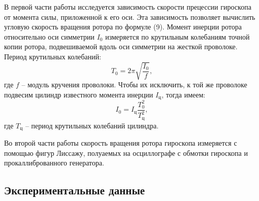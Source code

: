 \documentclass[a4paper, 12pt]{article}%
\begin{document}
В первой части работы исследуется зависимость скорости прецессии гироскопа от момента силы, приложенной к его оси. Эта зависимость позволяет вычислить угловую скорость вращения ротора по формуле (9). Момент инерции ротора относительно оси симметрии $I_0$ измеряется по крутильным колебаниям точной копии ротора, подвешиваемой вдоль оси симметрии на жесткой проволоке. Период крутильных колебаний:
\begin{equation}
T_0=2\pi\sqrt{\dfrac{I_0}{f}},
\end{equation}
где $f$ -- модуль кручения проволоки. Чтобы их исключить, к той же проволоке подвесим цилиндр известного момента инерции $I_{\text{ц}}$, тогда имеем:
\begin{equation}
I_0=I_{\text{ц}}\dfrac{T^2_0}{T^2_{\text{ц}}},
\end{equation}
где $T_{\text{ц}}$ -- период крутильных колебаний цилиндра.

Во второй части работы скорость вращения ротора гироскопа измеряется с помощью фигур Лиссажу, полуаемых на осциллографе с обмотки гироскопа и прокаллиброванного генератора.
\subsection{Экспериментальные данные}
\end{document}
